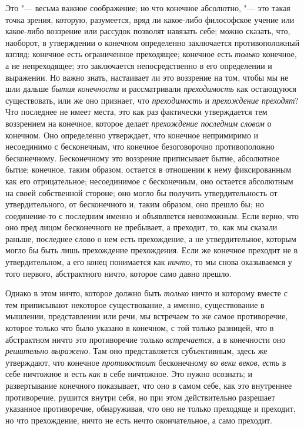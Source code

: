 Это "--- весьма важное соображение; но что конечное абсолютно, "--- это такая
точка зрения, которую, разумеется, вряд ли какое-либо философское учение
или какое-либо воззрение или рассудок позволят навязать себе; можно
сказать, что, наоборот, в утверждении о конечном определенно заключается
противоположный взгляд: конечное есть ограниченное преходящее; конечное
есть {\em только} конечное, а не непреходящее; это
заключается непосредственно в его определении и выражении. Но важно знать,
настаивает ли это воззрение на том, чтобы мы не шли дальше
{\em бытия конечности} и рассматривали
{\em преходимость} как остающуюся существовать, или же
оно признает, что {\em преходимость} и
{\em прехождение преходят}? Что последнее не имеет
места, это как раз фактически утверждается тем воззрением на конечное,
которое делает {\em прехождение последним словом} о
конечном. Оно определенно утверждает, что конечное непримиримо и
несоединимо с бесконечным, что конечное безоговорочно противоположно
бесконечному. Бесконечному это воззрение приписывает бытие, абсолютное
бытие; конечное, таким образом, остается в отношении к нему фиксированным
как его отрицательное; несоединимое с бесконечным, оно остается абсолютным
на своей собственной стороне; оно могло бы получить утвердительность от
утвердительного, от бесконечного и, таким образом, оно прешло бы; но
соединение-то с последним именно и объявляется невозможным. Если верно, что
оно пред лицом бесконечного не пребывает, а преходит, то, как мы сказали
раньше, последнее слово о нем есть прехождение, а не утвердительное,
которым могло бы быть лишь прехождение прехождения. Если же конечное
преходит не в утвердительном, а его конец понимается как
{\em ничто}, то мы снова оказываемся у того первого,
абстрактного ничто, которое само давно прешло.

Однако в этом ничто, которое должно быть {\em только}
ничто и которому вместе с тем приписывают некоторое существование, а
именно, существование в мышлении, представлении или речи, мы встречаем то
же самое противоречие, которое только что было указано в конечном, с той
только разницей, что в абстрактном ничто это противоречие только
{\em встречается}, а в конечности оно
{\em решительно выражено}. Там оно представляется
субъективным, здесь же утверждают, что конечное
{\em противостоит} бесконечному
{\em во веки веков}, {\em есть} в
себе ничтожное и есть {\em как} в себе ничтожное. Это
нужно осознать; и развертывание конечного показывает, что оно в самом себе,
как это внутреннее противоречие, рушится внутри себя, но при этом
действительно разрешает указанное противоречие, обнаруживая, что оно не
только преходяще и преходит, но что прехождение, ничто не есть нечто
окончательное, а само преходит.

